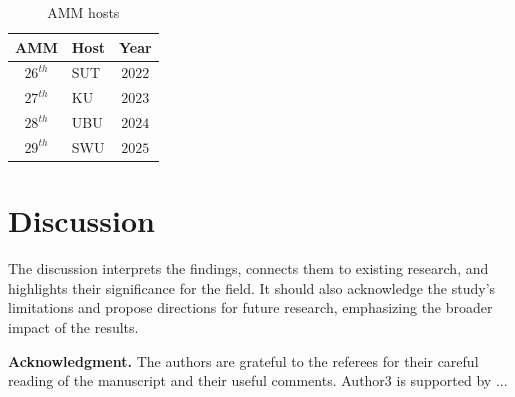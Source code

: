 \documentclass[12pt, a4paper, twoside]{article}
\theoremstyle{plain}
\theoremstyle{definition}
\theoremstyle{remark}
\numberwithin{equation}{section}
\begin{document}
\begin{table}[h]
\caption{AMM hosts}
\begin{center}
\begin{tabular}{clc}  \hline
 AMM & Host & Year\\ \hline\hline
 $26^{th}$ & SUT &$2022$ \\ 
$27^{th}$ & KU  &$2023$ \\ 
$28^{th}$ & UBU &$2024$ \\ 
$29^{th}$ & SWU &$2025$ \\ 	 
\hline
\end{tabular}
\label{yourname:tableofamm}
\end{center}
\end{table}

\section{Discussion}
The discussion interprets the findings, connects them to existing research, and highlights their significance for the field. It should also acknowledge the study's limitations and propose directions for future research, emphasizing the broader impact of the results.

\bigskip\noindent
\textbf{Acknowledgment.} The authors are grateful to the referees for their careful reading of the manuscript and their useful comments. Author3 is supported by ...
\end{document}
